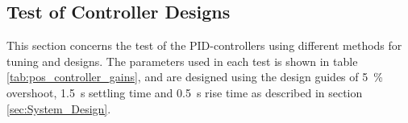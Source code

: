 \documentclass[../../main.tex]{subfiles}
\begin{document}
\subsection{Test of Controller Designs}\label{subsec:testControllerDesign}
This section concerns the test of the PID-controllers using different methods for tuning and designs. The parameters used in each test is shown in table \ref{tab:pos_controller_gains}, and are designed using the design guides of \SI{5}{\percent} overshoot, \SI{1,5}{\second} settling time and \SI{0,5}{\second} rise time as described in section \ref{sec:System_Design}.
\end{document}
